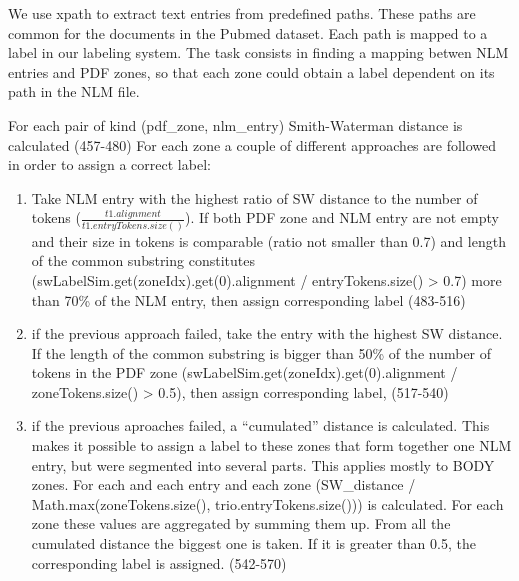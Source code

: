 We use xpath to extract text entries from predefined paths. These paths are common for the documents in the Pubmed dataset. Each path is mapped to a label in our labeling system. The task consists in finding a mapping betwen NLM entries and PDF zones, so that each zone could obtain a label dependent on its path in the NLM file.

For each pair of kind (pdf\_zone, nlm\_entry) Smith-Waterman distance
is calculated (457-480) For each zone a couple of different approaches are followed in order to assign a correct label:
\begin{enumerate}
\item Take NLM entry with the highest ratio of SW distance to the number of tokens ($\frac{t1.alignment}{t1.entryTokens.size()}$). If both PDF zone and NLM entry are not empty and their size in tokens is comparable (ratio not smaller than 0.7) and length of the common substring constitutes (swLabelSim.get(zoneIdx).get(0).alignment / entryTokens.size() > 0.7) more than 70\% of the NLM entry, then assign corresponding label (483-516)
\item if the previous approach failed, take the entry with the highest SW distance. If the length of the common substring is bigger than 50\% of the number of tokens in the PDF zone (swLabelSim.get(zoneIdx).get(0).alignment / zoneTokens.size() > 0.5), then assign corresponding label, (517-540)
\item if the previous aproaches failed, a ``cumulated'' distance is calculated. This makes it possible to assign a label to these zones that form together one NLM entry, but were segmented into several parts. This applies mostly to BODY zones. For each and each entry and each zone (SW\_distance / Math.max(zoneTokens.size(), trio.entryTokens.size())) is calculated. For each zone these values are aggregated by summing them up. From all the cumulated distance the biggest one is taken. If it is greater than 0.5, the corresponding label is assigned. (542-570)
\end{enumerate}
